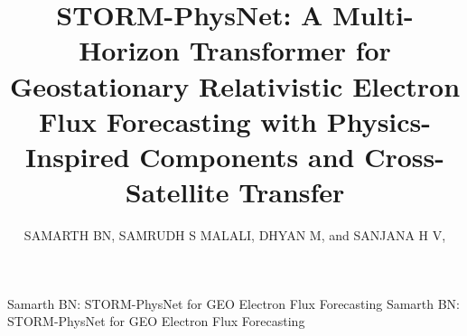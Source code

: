 \documentclass{ieeeaccess}
\begin{document}

\title{STORM-PhysNet: A Multi-Horizon Transformer for Geostationary Relativistic Electron Flux Forecasting with Physics-Inspired Components and Cross-Satellite Transfer}

\author{\uppercase{Samarth BN}, \uppercase{Samrudh S Malali}, \uppercase{Dhyan M}, and \uppercase{Sanjana H V}, }
\address[1]{Department of Electronics and Communication Engineering, 2nd Year Undergraduate, RV College of Engineering, Bengaluru, India (e-mail: samarthbn.ec25@rvce.edu.in, samrudhsmalali.ec25@rvce.edu.in, dhyanm.ec25@rvce.edu.in)}
\address[2]{Department of Artificial Intelligence and Machine Learning Engineering, 2nd Year Undergraduate, RV College of Engineering, Bengaluru, India (e-mail: sanjanahv.ci25@rvce.edu.in)}
\markboth
{Samarth BN: STORM-PhysNet for GEO Electron Flux Forecasting}
{Samarth BN: STORM-PhysNet for GEO Electron Flux Forecasting}
\end{document}
